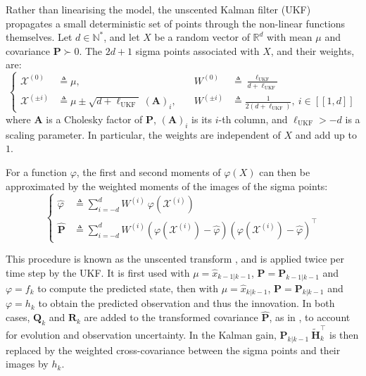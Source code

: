 Rather than linearising the model, the unscented Kalman filter (UKF) \cite{bib:UKF} propagates a small deterministic set of points through the non-linear functions themselves. Let $d\in\mathbb{N}^*$, and let $X$ be a random vector of $\mathbb{R}^d$ with mean $\mu$ and covariance $\mathbf{P}\succ0$. The $2d+1$ sigma points associated with $X$, and their weights, are:
\begin{equation}
	\left\{\begin{aligned}
	\mathcal{X}^{(0)}&\triangleq\mu,&\quad W^{(0)}&\triangleq\frac{\ell_{\mathrm{UKF}}}{d+\ell_{\mathrm{UKF}}}\\
	\mathcal{X}^{(\pm i)}&\triangleq\mu\pm\sqrt{d+\ell_{\mathrm{UKF}}}\:(\mathbf{A})_i,&\quad W^{(\pm i)}&\triangleq\frac{1}{2(d+\ell_{\mathrm{UKF}})},\:i\in[\![1,d]\!]
	\end{aligned}\right.
\end{equation}
where $\mathbf{A}$ is a Cholesky factor \cite{bib:matrix-computations} of $\mathbf{P}$, $(\mathbf{A})_i$ is its $i$-th column, and $\ell_{\mathrm{UKF}}>-d$ is a scaling parameter. In particular, the weights are independent of $X$ and add up to $1$.

For a function $\varphi$, the first and second moments of $\varphi(X)$ can then be approximated by the weighted moments of the images of the sigma points:
\begin{equation}
	\left\{\begin{aligned}
	\hat{\varphi}&\triangleq\sum_{i=-d}^{d}W^{(i)}\:\varphi\left(\mathcal{X}^{(i)}\right)\\
	\hat{\mathbf{P}}&\triangleq\sum_{i=-d}^{d}W^{(i)}\left(\varphi\left(\mathcal{X}^{(i)}\right)-\hat{\varphi}\right)\left(\varphi\left(\mathcal{X}^{(i)}\right)-\hat{\varphi}\right)^\top
	\end{aligned}\right.
\end{equation}

This procedure is known as the unscented transform \cite{bib:unscented}, and is applied twice per time step by the UKF. It is first used with $\mu=\hat{x}_{k-1|k-1}$, $\mathbf{P}=\mathbf{P}_{k-1|k-1}$ and $\varphi=f_k$ to compute the predicted state, then with $\mu=\hat{x}_{k|k-1}$, $\mathbf{P}=\mathbf{P}_{k|k-1}$ and $\varphi=h_k$ to obtain the predicted observation and thus the innovation. In both cases, $\mathbf{Q}_k$ and $\mathbf{R}_k$ are added to the transformed covariance $\hat{\mathbf{P}}$, as in , to account for evolution and observation uncertainty. In the Kalman gain, $\mathbf{P}_{k|k-1}\:\tilde{\mathbf{H}}_k^\top$ is then replaced by the weighted cross-covariance between the sigma points and their images by $h_k$.

